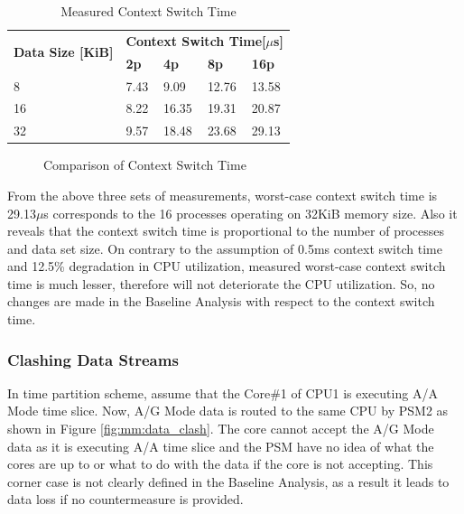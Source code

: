 \begin{table}[h!]
	\begin{tabularx}{\textwidth}{|X|X|X|X|X|}
		\hline
		\multirow{2}{*}{\textbf{Data Size [KiB]}} & \multicolumn{4}{c|}{\textbf{Context Switch Time[\boldmath$\mu$s]}} \\ \cline{2-5}
		& \textbf{2p} & \textbf{4p} & \textbf{8p} & \textbf{16p}  \\ \hline 
		8 & 7.43 & 9.09 & 12.76 & 13.58 \\ \hline
		16 & 8.22 & 16.35 & 19.31 & 20.87 \\ \hline
		32 & 9.57 & 18.48 & 23.68 & 29.13 \\ \hline
	\end{tabularx}
\caption{Measured Context Switch Time}
\label{mm:ctxsw:lmbench}
\end{table}

\begin{figure}[h!]
\centering
{}
\caption{Comparison of Context Switch Time}
\label{mm:cntxt_switch_graph}
\end{figure}

From the above three sets of measurements, worst-case context switch time is 29.13$\mu$s corresponds to the 16 processes operating on 32KiB memory size. Also it reveals that the context switch time is proportional to the number of processes and data set size. On contrary to the assumption of 0.5ms context switch time and 12.5\% degradation in CPU utilization, measured worst-case context switch time is much lesser, therefore will not deteriorate the CPU utilization. So, no changes are made in the Baseline Analysis with respect to the context switch time.

\subsubsection{Clashing Data Streams}
In time partition scheme, assume that the Core\#1 of CPU1 is executing A/A Mode time slice. Now, A/G Mode data is routed to the same CPU by PSM2 as shown in Figure \ref{fig:mm:data_clash}. The core cannot accept the A/G Mode data as it is executing A/A time slice and the PSM have no idea of what the cores are up to or what to do with the data if the core is not accepting. This corner case is not clearly defined in the Baseline Analysis, as a result it leads to data loss if no countermeasure is provided.

